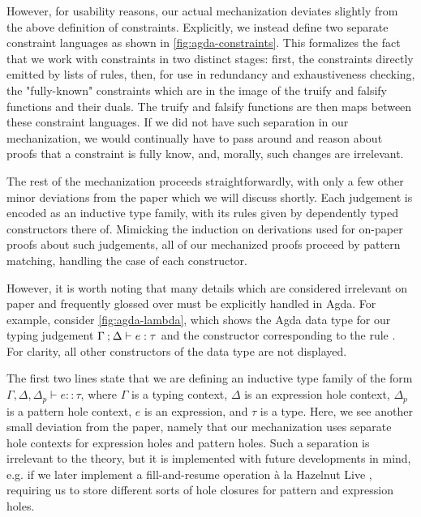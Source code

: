 

However, for usability reasons, our actual mechanization deviates slightly from the above definition of constraints. Explicitly, we instead define two separate constraint languages as shown in \autoref{fig:agda-constraints}. This formalizes the fact that we work with constraints in two distinct stages: first, the constraints directly emitted by lists of rules, then, for use in redundancy and exhaustiveness checking, the "fully-known" constraints which are in the image of the truify and falsify functions and their duals. The truify and falsify functions are then maps between these constraint languages. If we did not have such separation in our mechanization, we would continually have to pass around and reason about proofs that a constraint is fully know, and, morally, such changes are irrelevant.



The rest of the mechanization proceeds straightforwardly, with only a few other minor deviations from the paper which we will discuss shortly. Each judgement is encoded as an inductive type family, with its rules given by dependently typed constructors there of. Mimicking the induction on derivations used for on-paper proofs about such judgements, all of our mechanized proofs proceed by pattern matching, handling the case of each constructor. 

However, it is worth noting that many details which are considered irrelevant on paper and frequently glossed over must be explicitly handled in Agda. For example, consider \autoref{fig:agda-lambda}, which shows the Agda data type for our typing judgement $\Gamma \mathbin{;} \Delta \vdash e : \tau$ and the constructor corresponding to the rule \TLam. For clarity, all other constructors of the data type are not displayed.



The first two lines state that we are defining an inductive type family of the form $\Gamma, \Delta, \Delta_p \vdash e :: \tau$, where $\Gamma$ is a typing context, $\Delta$ is an expression hole context, $\Delta_p$ is a pattern hole context, $e$ is an expression, and $\tau$ is a type. Here, we see another small deviation from the paper, namely that our mechanization uses separate hole contexts for expression holes and pattern holes. Such a separation is irrelevant to the theory, but it is implemented with future developments in mind, e.g. if we later implement a fill-and-resume operation \`a la Hazelnut Live \cite{DBLP:journals/pacmpl/OmarVCH19}, requiring us to store different sorts of hole closures for pattern and expression holes.

